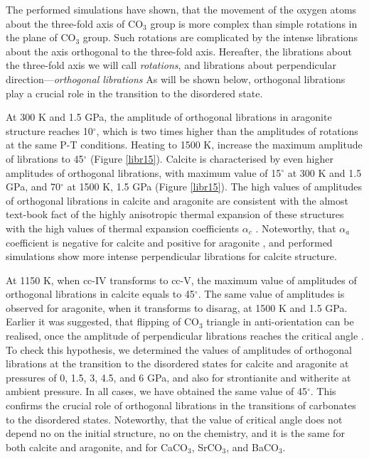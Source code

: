 \documentclass[journal=jacsat,manuscript=article]{achemso}
\begin{document}
The performed simulations have shown, that the movement of the oxygen atoms about the three-fold axis of CO$_3$ group is more complex than simple rotations in the plane of CO$_3$ group. 
Such rotations are complicated by the intense librations about the axis orthogonal to the three-fold axis.
Hereafter, the librations about the three-fold axis we will call {\it rotations}, and librations about perpendicular direction---{\it orthogonal librations}
As will be shown below, orthogonal librations play a crucial role in the transition to the disordered state.

At 300 K and 1.5 GPa, the amplitude of orthogonal librations in aragonite structure reaches 10$^{\circ}$, which is two times higher than the amplitudes of rotations at the same P-T conditions.
Heating to 1500 K, increase the maximum amplitude of librations to 45$^{\circ}$ (Figure \ref{libr15}). 
Calcite is characterised by even higher amplitudes of orthogonal librations, with maximum value of 15$^{\circ}$ at 300 K and 1.5 GPa,   and 70$^{\circ}$ at  1500 K, 1.5 GPa (Figure \ref{libr15}).  
The high values of amplitudes of orthogonal librations in calcite and aragonite are consistent with the almost text-book fact of the highly anisotropic thermal expansion of these structures with the high values of thermal expansion coefficients $\alpha_c$  \cite{markgraf1985}.
Noteworthy, that $\alpha_a$ coefficient is negative for calcite \cite{markgraf1985} and positive for aragonite \cite{antao2009, ye2012}, and performed simulations show more intense perpendicular librations for calcite structure.

At 1150 K, when cc-IV transforms to cc-V, the maximum value of amplitudes of orthogonal librations in calcite equals to 45$^{\circ}$. 
The same value of amplitudes is observed for aragonite, when it transforms to disarag, at 1500 K and 1.5 GPa. 
Earlier it was suggested, that flipping of CO$_3$ triangle in anti-orientation can be realised, once the amplitude of perpendicular librations reaches the critical angle \cite{dove2005}.
To check this hypothesis, we determined the values of amplitudes of orthogonal librations at the transition to the disordered states for calcite and aragonite at pressures of 0, 1.5, 3, 4.5, and 6 GPa, and also for strontianite and witherite at ambient pressure.
In all cases, we have obtained the same value of 45$^{\circ}$.
This confirms the crucial role of orthogonal librations in the transitions of carbonates to the disordered states.
Noteworthy, that the value of critical angle does not depend no on the initial structure, no on the chemistry, and it is the same for both calcite and aragonite, and for CaCO$_3$, SrCO$_3$, and BaCO$_3$.
\end{document}
